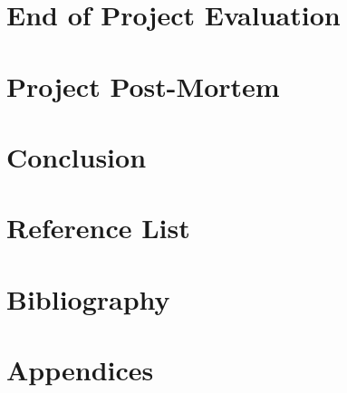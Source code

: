 \documentclass{article}
\begin{document}
\section{End of Project Evaluation}

\section{Project Post-Mortem}

\section{Conclusion}

\section{Reference List}

\section{Bibliography}

\section{Appendices}
\end{document}
